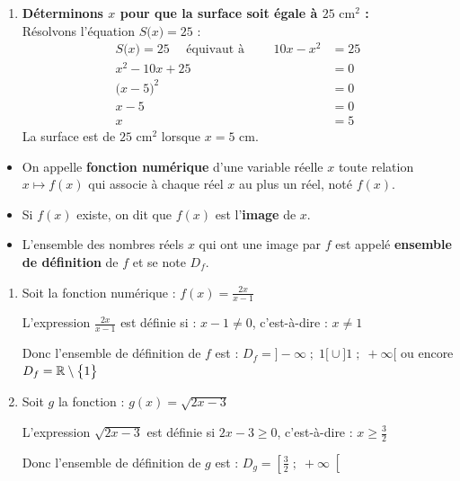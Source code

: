 \documentclass[10pt, a4paper]{article}
\begin{document}
\begin{Solution}[ACTIVITÉ][1]
\begin{enumerate}[leftmargin=*,itemsep=0.5pt]
    \item \textbf{Déterminons $x$ pour que la surface soit égale à $25\text{ cm}^2$ :} \\
    Résolvons l'équation $S\big( x \big) = 25$ :
   \begin{align*}
    S\big( x \big) = 25 \quad \text{ équivaut à } \qquad 10x - x^2 &= 25 \\
     x^2 - 10x + 25 &= 0 \\
     \big( x - 5 \big)^2 &= 0 \\
     x - 5 &= 0 \\
     x &= 5
    \end{align*}
        La surface est de $25\text{ cm}^2$ lorsque $x = 5\text{ cm}$.
\end{enumerate}
\end{Solution}

\begin{Definition}[]
\begin{itemize}[leftmargin=*,itemsep=0.5pt]
    \item On appelle \textbf{fonction numérique} d'une variable réelle $x$ toute relation $x \mapsto f(x)$ qui associe à chaque réel $x$ au plus un réel, noté $f(x)$.
    \item Si $f(x)$ existe, on dit que $f(x)$ est l'\textbf{image} de $x$.
    \item L'ensemble des nombres réels $x$ qui ont une image par $f$ est appelé \textbf{ensemble de définition} de $f$ et se note $D_f$.
\end{itemize}
\end{Definition}

\begin{Exemple}[][15 min]
\begin{enumerate}[leftmargin=*,itemsep=0.5pt]
    \item Soit la fonction numérique : $f(x) = \frac{2x}{x-1}$

    L'expression $\frac{2x}{x-1}$ est définie si : $x - 1 \neq 0$, 
    c'est-à-dire : $x \neq 1$ 
    
     Donc l'ensemble de définition de $f$ est : \quad $D_f = \big]-\infty \;;\; 1\big[ \cup \big]1 \;;\; +\infty\big[$ \quad ou encore \quad $D_f = \mathbb{R} \setminus \big\{1\big\}$

    \item Soit $g$ la fonction : $g(x) = \sqrt{2x - 3}$

    L'expression $\sqrt{2x - 3}$ est définie si $2x - 3 \geq 0$, 
    c'est-à-dire : $x \geq \frac{3}{2}$

    Donc l'ensemble de définition de $g$ est : 
    $D_g = \left[\frac{3}{2} \;;\; +\infty\right[$
\end{enumerate}
\end{Exemple}
\end{document}
